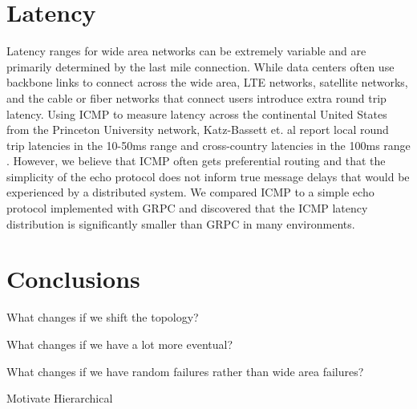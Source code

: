 \section{Latency}

Latency ranges for wide area networks can be extremely variable and are primarily determined by the last mile connection. While data centers often use backbone links to connect across the wide area, LTE networks, satellite networks, and the cable or fiber networks that connect users introduce extra round trip latency. Using ICMP to measure latency across the continental United States from the Princeton University network, Katz-Bassett et. al report local round trip latencies in the 10-50ms range and cross-country latencies in the 100ms range \cite{katz-bassett_towards_2006}. However, we believe that ICMP often gets preferential routing and that the simplicity of the echo protocol does not inform true message delays that would be experienced by a distributed system. We compared ICMP to a simple echo protocol implemented with GRPC and discovered that the ICMP latency distribution is significantly smaller than GRPC in many environments.

\section{Conclusions}

What changes if we shift the topology?

What changes if we have a lot more eventual?

What changes if we have random failures rather than wide area failures?

Motivate Hierarchical
